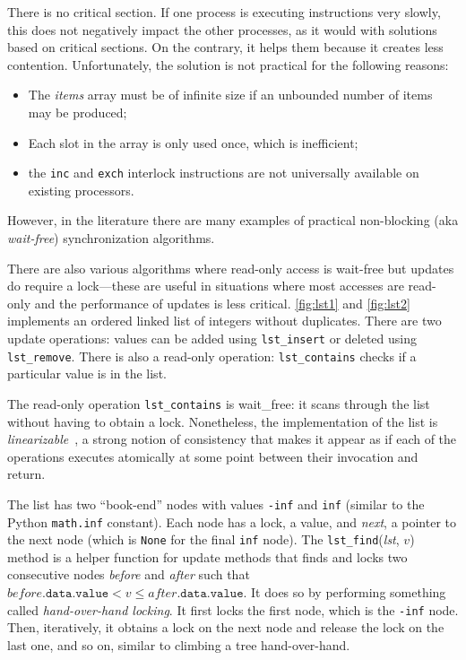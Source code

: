 \documentclass{report}
\begin{document}
There is no critical section.  If one process is executing instructions
very slowly, this does not negatively impact the other processes, as it
would with solutions based on critical sections.
On the contrary, it helps them because it creates less contention.
Unfortunately, the solution is not practical for the following reasons:
\begin{itemize}
\item The \textit{items} array must be of infinite size if an unbounded number
of items may be produced;
\item Each slot in the array is only used once, which is inefficient;
\item the \texttt{inc} and \texttt{exch} interlock instructions are not
universally available on existing processors.
\end{itemize}
However, in the literature there are many examples of practical
non-blocking (aka \emph{wait-free})
%
synchronization algorithms.

There are also various algorithms where read-only access is wait-free
but updates do require a lock---these are useful in situations where
most accesses are read-only and the performance of updates is less
critical. %
\autoref{fig:lst1} and \autoref{fig:lst2} implements an ordered linked
list of integers without duplicates.
There are two update operations:
values can be added using \texttt{lst\_insert} or deleted using
\texttt{lst\_remove}.
There is also a read-only operation: \texttt{lst\_contains} checks if
a particular value is in the list.
%

The read-only operation \texttt{lst\_contains} is wait\_free: it scans
through the list without having to obtain a lock.
Nonetheless, the implementation of the list is
\emph{linearizable}~\cite{HW90},
%
a strong notion of consistency that
makes it appear as if each of the operations executes atomically at
some point between their invocation and return.

The list has two ``book-end'' nodes with values \texttt{-inf} and
\texttt{inf} (similar to the Python \texttt{math.inf} constant).
Each node has a lock, a value, and \textit{next}, a pointer to the next node
(which is \texttt{None} for the final \texttt{inf} node).
The \texttt{lst\_find}(\textit{lst}, $v$) method is a helper function for update
methods that
finds and locks two consecutive nodes \textit{before} and \textit{after}
such that $\mathit{before}.\mathtt{data.value} < v \le \mathit{after}.\mathtt{data.value}$.
It does so by performing something called \emph{hand-over-hand locking}.
%
It first locks the first node, which is the \texttt{-inf} node.
Then, iteratively, it obtains a lock on the next node and release the
lock on the last one, and so on, similar to climbing a tree
hand-over-hand.
\end{document}
